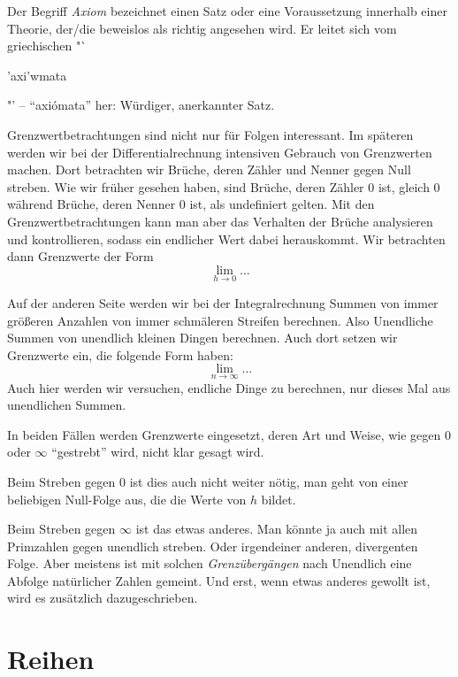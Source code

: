Der Begriff \emph{Axiom} bezeichnet einen Satz oder eine Voraussetzung innerhalb einer Theorie, der/die beweislos als richtig angesehen wird. Er leitet sich vom griechischen "`\begin{greek}'axi'wmata\end{greek}"' -- "`axi\'omata"' her: Würdiger, anerkannter Satz.

\bigskip 

Grenzwertbetrachtungen sind nicht nur für Folgen interessant. Im späteren werden wir bei der Differentialrechnung intensiven Gebrauch von Grenzwerten machen. Dort betrachten wir Brüche, deren Zähler und Nenner gegen Null streben. Wie wir früher gesehen haben, sind Brüche, deren Zähler 0 ist, gleich 0 während Brüche, deren Nenner 0 ist, als undefiniert gelten. Mit den Grenzwertbetrachtungen kann man aber das Verhalten der Brüche analysieren und kontrollieren, sodass ein endlicher Wert dabei herauskommt. Wir betrachten dann Grenzwerte der Form
\begin{equation}
\lim\limits_{h \rightarrow 0} \dots
\end{equation}

Auf der anderen Seite werden wir bei der Integralrechnung Summen von immer größeren Anzahlen von immer schmäleren Streifen berechnen. Also Unendliche Summen von unendlich kleinen Dingen berechnen. Auch dort setzen wir Grenzwerte ein, die folgende Form haben:
\begin{equation}
\lim\limits_{n \rightarrow \infty} \dots
\end{equation}
Auch hier werden wir versuchen, endliche Dinge zu berechnen, nur dieses Mal aus unendlichen Summen. 

In beiden Fällen werden Grenzwerte eingesetzt, deren Art und Weise, wie gegen $0$ oder $\infty$ "`gestrebt"' wird, nicht klar gesagt wird. 

Beim Streben gegen $0$ ist dies auch nicht weiter nötig, man geht von einer beliebigen Null-Folge aus, die die Werte von $h$ bildet. 

Beim Streben gegen $\infty$ ist das etwas anderes. Man könnte ja auch mit allen Primzahlen gegen unendlich streben. Oder irgendeiner anderen, divergenten Folge. Aber meistens ist mit solchen \emph{Grenzübergängen} nach Unendlich eine Abfolge natürlicher Zahlen gemeint. Und erst, wenn etwas anderes gewollt ist, wird es zusätzlich dazugeschrieben.

\section{Reihen}

